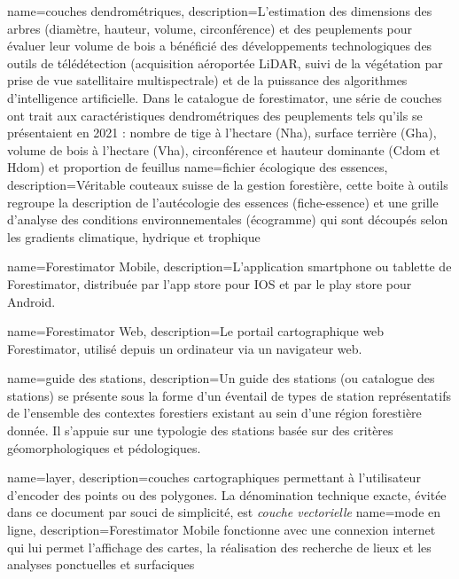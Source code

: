 \documentclass[12pt,a4paper]{report}
\begin{document}
{
	name={couches dendrométriques},
	description={L'estimation des dimensions des arbres (diamètre, hauteur, volume, circonférence) et des peuplements pour évaluer leur volume de bois a bénéficié des développements technologiques des outils de télédétection (acquisition aéroportée LiDAR, suivi de la végétation par prise de vue satellitaire multispectrale) et de la puissance des algorithmes d'intelligence artificielle. Dans le catalogue de forestimator, une série de couches ont trait aux caractéristiques dendrométriques des peuplements tels qu'ils se présentaient en 2021 : nombre de tige à l'hectare (Nha), surface terrière (Gha), volume de bois à l'hectare (Vha), circonférence et hauteur dominante (Cdom et Hdom) et proportion de feuillus}
}
{name={fichier écologique des essences},
	description={Véritable couteaux suisse de la gestion forestière, cette boite à outils regroupe la description de l'autécologie des essences (fiche-essence) et une grille d'analyse des conditions environnementales (écogramme) qui sont découpés selon les gradients climatique, hydrique et trophique}}

{
	name={Forestimator Mobile},
	description={L'application smartphone ou tablette de Forestimator, distribuée par l'app store pour IOS et par le play store pour Android.}
}

{
	name={Forestimator Web},
	description={Le portail cartographique web Forestimator, utilisé depuis un ordinateur via un navigateur web.}
}


{name={guide des stations},
	description={Un guide des stations (ou catalogue des stations) se présente sous la forme d'un éventail de types de station représentatifs de l'ensemble des contextes forestiers existant au sein d’une région forestière donnée. Il s’appuie sur une typologie des stations basée sur des critères géomorphologiques et pédologiques.}}

{
	name={layer},
	description={couches cartographiques permettant à l'utilisateur d'encoder des points ou des polygones. La dénomination technique exacte, évitée dans ce document par souci de simplicité, est \textit{couche vectorielle}}
}
{
	name={mode en ligne},
	description={Forestimator Mobile fonctionne avec une connexion internet qui lui permet l'affichage des cartes, la réalisation des recherche de lieux et les analyses ponctuelles et surfaciques}
}
\end{document}
